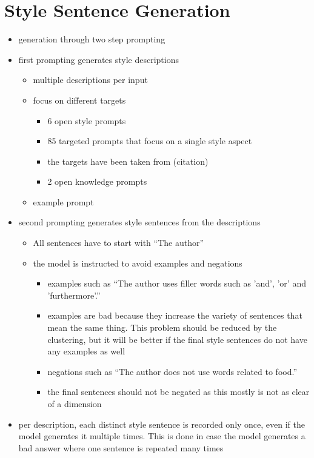 \section{Style Sentence Generation}
\label{sec:approach:style_sentence_generation}

\begin{itemize}
  \item generation through two step prompting
  \item first prompting generates style descriptions
        \begin{itemize}
          \item multiple descriptions per input
          \item focus on different targets
                \begin{itemize}
                  \item 6 open style prompts
                  \item 85 targeted prompts that focus on a single style aspect
                  \item the targets have been taken from (citation)
                  \item 2 open knowledge prompts
                \end{itemize}
          \item example prompt
        \end{itemize}
  \item second prompting generates style sentences from the descriptions
        \begin{itemize}
          \item All sentences have to start with \enquote{The author}
          \item the model is instructed to avoid examples and negations
                \begin{itemize}
                  \item examples such as \enquote{The author uses filler words such as 'and', 'or' and 'furthermore'.} %
                  \item examples are bad because they increase the variety of sentences that mean the same thing. This problem should be reduced by the clustering, but it will be better if the final style sentences do not have any examples as well
                  \item negations such as \enquote{The author does not use words related to food.}
                  \item the final sentences should not be negated as this mostly is not as clear of a dimension
                \end{itemize}
        \end{itemize}
  \item per description, each distinct style sentence is recorded only once, even if the model generates it multiple times. This is done in case the model generates a bad answer where one sentence is repeated many times
\end{itemize}